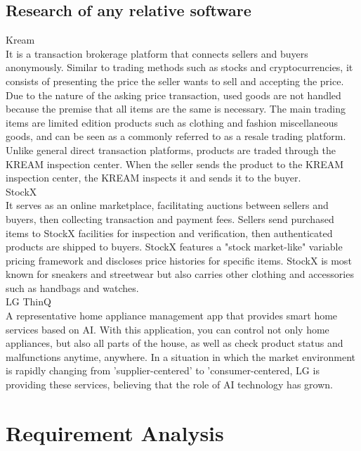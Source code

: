 \documentclass[conference]{IEEEtran}
\begin{document}
\subsection{Research of any relative software}

{Kream} \\ It is a transaction brokerage platform that connects sellers and buyers anonymously. Similar to trading methods such as stocks and cryptocurrencies, it consists of presenting the price the seller wants to sell and accepting the price. Due to the nature of the asking price transaction, used goods are not handled because the premise that all items are the same is necessary. The main trading items are limited edition products such as clothing and fashion miscellaneous goods, and can be seen as a commonly referred to as a resale trading platform. Unlike general direct transaction platforms, products are traded through the KREAM inspection center. When the seller sends the product to the KREAM inspection center, the KREAM inspects it and sends it to the buyer.\\

{StockX} \\ It serves as an online marketplace, facilitating auctions between sellers and buyers, then collecting transaction and payment fees. Sellers send purchased items to StockX facilities for inspection and verification, then authenticated products are shipped to buyers. StockX features a "stock market-like" variable pricing framework and discloses price histories for specific items. StockX is most known for sneakers and streetwear but also carries other clothing and accessories such as handbags and watches.\\

{LG ThinQ} \\ A representative home appliance management app that provides smart home services based on AI. With this application, you can control not only home appliances, but also all parts of the house, as well as check product status and malfunctions anytime, anywhere. In a situation in which the market environment is rapidly changing from 'supplier-centered' to 'consumer-centered, LG is providing these services, believing that the role of AI technology has grown.\\

\section{Requirement Analysis}
\end{document}
